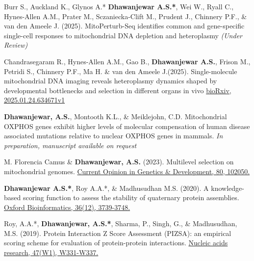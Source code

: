 


\begin{cvpubs}

\vspace{-1mm}


  \pubentry
    {Burr S., Auckland K., Glynos A.* \textbf{Dhawanjewar A.S.*}, Wei W., Ryall C., Hynes-Allen A.M., Prater M., Sczaniecka-Clift M., Prudent J., Chinnery P.F., \& van den Ameele J. (2025).}
    {MitoPerturb-Seq identifies common and gene-specific single-cell responses to mitochondrial DNA depletion and heteroplasmy}
    {\textit{(Under Review)}}

  \pubentry
    {Chandrasegaram R., Hynes-Allen A.M., Gao B., \textbf{Dhawanjewar A.S.}, Frison M., Petridi S., Chinnery P.F., Ma H. \& van den Ameele J.(2025).}
  {Single-molecule mitochondrial DNA imaging reveals heteroplasmy dynamics shaped by developmental bottlenecks and selection in different organs in vivo}
  {\href{https://doi.org/10.1101/2025.01.24.634671}{bioRxiv, 2025.01.24.634671v1}}

  \pubentry
    {\textbf{Dhawanjewar, A.S.}, Montooth K.L., \& Meiklejohn, C.D.}
  {Mitochondrial OXPHOS genes exhibit higher levels of molecular compensation of human disease associated mutations relative to nuclear OXPHOS genes in mammals.}
  {\textit{In preparation, manuscript available on request}}

  \pubentry
    {M. Florencia Camus \& \textbf{Dhawanjewar, A.S.} (2023).}
  {Multilevel selection on mitochondrial genomes.}
  {\href{https://doi.org/10.1016/j.gde.2023.102050}{Current Opinion in Genetics \& Development, 80, 102050.}}

  \pubentry
    {\textbf{Dhawanjewar A.S.*}, Roy A.A.*, \& Madhusudhan M.S. (2020).}
	{A knowledge-based scoring function to assess the stability of quaternary protein assemblies.}
	{\href{https://doi.org/10.1101/562520}{Oxford Bioinformatics, 36(12), 3739-3748.}}

  \pubentry
     {Roy, A.A.*, \textbf{Dhawanjewar, A.S.*}, Sharma, P., Singh, G., \& Madhusudhan, M.S. (2019).}
  	{Protein Interaction Z Score Assessment (PIZSA): an empirical scoring scheme for evaluation of protein-protein interactions.}
	{\href{https://doi.org/10.1093/nar/gkz368}{Nucleic acids research, 47(W1), W331-W337.}}


\end{cvpubs}
